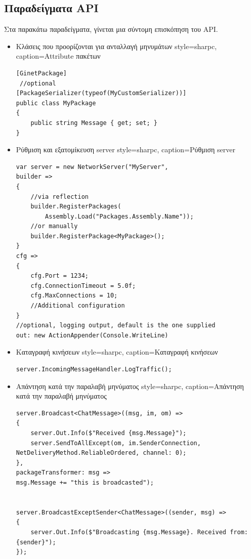 	\subsection{Παραδείγματα API}
	Στα παρακάτω παραδείγματα, γίνεται μια σύντομη επισκόπηση του \gls{API}.
	\begin{itemize}
		\item Κλάσεις που προορίζονται για ανταλλαγή μηνυμάτων
	\lstset
	{
		style=sharpc, 
		caption={Attribute πακέτων}
	}
		\begin{lstlisting}
[GinetPackage]
 //optional
[PackageSerializer(typeof(MyCustomSerializer))]
public class MyPackage
{
    public string Message { get; set; }
}          
		\end{lstlisting}
		\item Ρύθμιση και εξατομίκευση server
	\lstset
	{
		style=sharpc, 
		caption={Ρύθμιση server}
	}
		\begin{lstlisting}     
var server = new NetworkServer("MyServer",
builder =>
{
	//via reflection
	builder.RegisterPackages(
		Assembly.Load("Packages.Assembly.Name"));
	//or manually
	builder.RegisterPackage<MyPackage>();
}
cfg =>
{
	cfg.Port = 1234;
	cfg.ConnectionTimeout = 5.0f;
	cfg.MaxConnections = 10;
	//Additional configuration
}
//optional, logging output, default is the one supplied			 
out: new ActionAppender(Console.WriteLine) 
		\end{lstlisting}
		\item Καταγραφή κινήσεων		
	\lstset
	{
		style=sharpc, 
		caption={Καταγραφή κινήσεων}
	}
		\begin{lstlisting}
server.IncomingMessageHandler.LogTraffic();
		\end{lstlisting}		
		\item Απάντηση κατά την παραλαβή μηνύματος
	\lstset
	{
		style=sharpc, 
		caption={Απάντηση κατά την παραλαβή μηνύματος}
	}
		\begin{lstlisting}
server.Broadcast<ChatMessage>((msg, im, om) =>
{
	server.Out.Info($"Received {msg.Message}");
	server.SendToAllExcept(om, im.SenderConnection, NetDeliveryMethod.ReliableOrdered, channel: 0);
}, 
packageTransformer: msg => 
msg.Message += "this is broadcasted");	


server.BroadcastExceptSender<ChatMessage>((sender, msg) =>
{
	server.Out.Info($"Broadcasting {msg.Message}. Received from: {sender}");
});
		\end{lstlisting} 		


\end{itemize}
